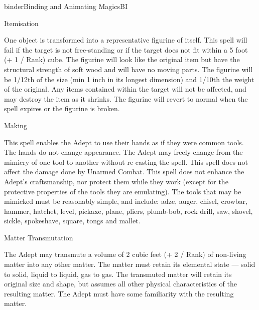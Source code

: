 \begin{college}[1.1]{binder}{Binding and Animating Magics}{BI}
\begin{spell}[S-7]{Itemisation}

\begin{effects}
One object is transformed into a representative figurine of itself.
This spell will fail if the target is not free-standing or if the
target does not fit within a 5 foot (+ 1 / Rank) cube.  The figurine
will look like the original item but have the structural strength of
soft wood and will have no moving parts.  The figurine will be 1/12th
of the size (min 1 inch in its longest dimension) and 1/10th the
weight of the original.  Any items contained within the target will
not be affected, and may destroy the item as it shrinks.  The figurine
will revert to normal when the spell expires or the figurine is
broken.

\end{effects}
\end{spell}

\begin{spell}[S-8]{Making}

\begin{effects}
This spell enables the Adept to use their hands as if they were common
tools. The hands do not change appearance. The Adept may freely change
from the mimicry of one tool to another without re-casting the
spell. This spell does not affect the damage done by Unarmed
Combat. This spell does not enhance the Adept's craftsmanship, nor
protect them while they work (except for the protective properties of
the tools they are emulating).  The tools that may be mimicked must be
reasonably simple, and include: adze, auger, chisel, crowbar, hammer,
hatchet, level, pickaxe, plane, pliers, plumb-bob, rock drill, saw,
shovel, sickle, spokeshave, square, tongs and mallet.

\end{effects}
\end{spell}

\begin{spell}[S-9]{Matter Transmutation}

\begin{effects}
The Adept may transmute a volume of 2 cubic feet (+ 2 / Rank) of
non-living matter into any other matter. The matter must retain its
elemental state --- solid to solid, liquid to liquid, gas to gas. The
transmuted matter will retain its original size and shape, but assumes
all other physical characteristics of the resulting matter. The Adept
must have some familiarity with the resulting matter.


\end{effects}
\end{spell}
\end{college}
